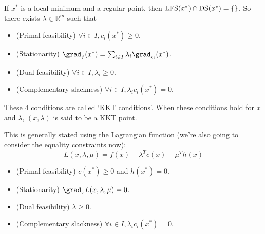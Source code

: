 If $x^*$ is a local minimum and a regular point, then $\operatorname{LFS}(x^*) \cap \operatorname{DS}(x^*) = \{\}$.
So there exists $\lambda \in \mathbb{R}^m$ such that
\begin{itemize}
\item (Primal feasibility) $\forall i \in I, c_i(x^*) \ge 0$.
\item (Stationarity) $\grad_f(x^*) = \sum_{i \in I} \lambda_i\grad_{c_i}(x^*)$.
\item (Dual feasibility) $\forall i \in I, \lambda_i \ge 0$.
\item (Complementary slackness) $\forall i \in I, \lambda_ic_i(x^*) = 0$.
\end{itemize}
These 4 conditions are called `KKT conditions'.
When these conditions hold for $x$ and $\lambda$, $(x, \lambda)$ is said to be a KKT point.

This is generally stated using the Lagrangian function
(we're also going to consider the equality constraints now):
\[ L(x, \lambda, \mu) = f(x) - \lambda^Tc(x) - \mu^Th(x) \]
\begin{itemize}
\item (Primal feasibility) $c(x^*) \ge 0$ and $h(x^*) = 0$.
\item (Stationarity) $\grad_x L(x, \lambda, \mu) = 0$.
\item (Dual feasibility) $\lambda \ge 0$.
\item (Complementary slackness) $\forall i \in I, \lambda_ic_i(x^*) = 0$.
\end{itemize}


